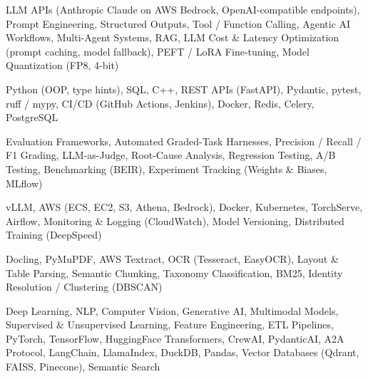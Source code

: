 \documentclass[letter,10pt]{article}
\begin{document}
 LLM APIs (Anthropic Claude on AWS Bedrock, OpenAI-compatible endpoints), Prompt Engineering, Structured Outputs, Tool / Function Calling, Agentic AI Workflows, Multi-Agent Systems, RAG, LLM Cost \& Latency Optimization (prompt caching, model fallback), PEFT / LoRA Fine-tuning, Model Quantization (FP8, 4-bit)\par\vspace{2pt}

 Python (OOP, type hints), SQL, C++, REST APIs (FastAPI), Pydantic, pytest, ruff / mypy, CI/CD (GitHub Actions, Jenkins), Docker, Redis, Celery, PostgreSQL\par\vspace{2pt}

 Evaluation Frameworks, Automated Graded-Task Harnesses, Precision / Recall / F1 Grading, LLM-as-Judge, Root-Cause Analysis, Regression Testing, A/B Testing, Benchmarking (BEIR), Experiment Tracking (Weights \& Biases, MLflow)\par\vspace{2pt}

 vLLM, AWS (ECS, EC2, S3, Athena, Bedrock), Docker, Kubernetes, TorchServe, Airflow, Monitoring \& Logging (CloudWatch), Model Versioning, Distributed Training (DeepSpeed)\par\vspace{2pt}

 Docling, PyMuPDF, AWS Textract, OCR (Tesseract, EasyOCR), Layout \& Table Parsing, Semantic Chunking, Taxonomy Classification, BM25, Identity Resolution / Clustering (DBSCAN)\par\vspace{2pt}

 Deep Learning, NLP, Computer Vision, Generative AI, Multimodal Models, Supervised \& Unsupervised Learning, Feature Engineering, ETL Pipelines, PyTorch, TensorFlow, HuggingFace Transformers, CrewAI, PydanticAI, A2A Protocol, LangChain, LlamaIndex, DuckDB, Pandas, Vector Databases (Qdrant, FAISS, Pinecone), Semantic Search
\end{document}

